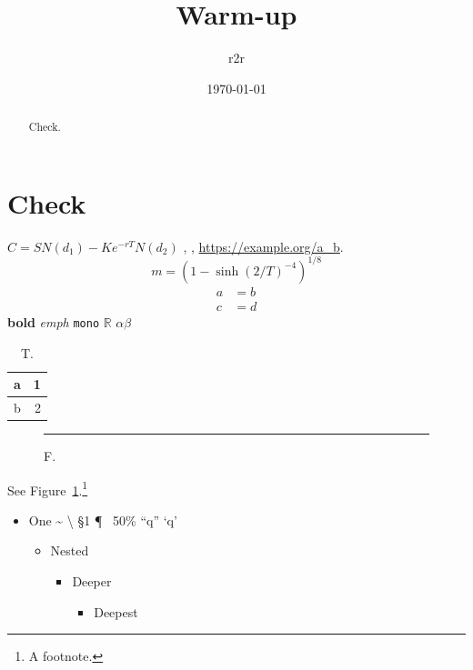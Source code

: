 \documentclass[11pt]{article}
\title{Warm-up}\author{r2r}\affil{none}\date{\today}
\begin{document}
\maketitle
\begin{abstract}Check.\end{abstract}
\begin{center}\end{center}
\section{Check}
$C = S N(d_1) - K e^{-rT} N(d_2)$ \cite{x}, \citet{x}, \url{https://example.org/a_b}.
\begin{equation} m = (1-\sinh(2/T)^{-4})^{1/8} \end{equation}
\begin{align} a &= b \\ c &= d \end{align}
\textbf{bold} \emph{emph} \texttt{mono} $\mathbb{R}$ $\alpha\beta$
\begin{table}[h]\centering\begin{tabular}{lr}\toprule a & 1\\\midrule b & 2\\\bottomrule\end{tabular}\caption{T.}\end{table}
\begin{figure}[h]\centering\rule{2cm}{1cm}\caption{F.}\label{fig:x}\end{figure}
See Figure~\ref{fig:x}.\footnote{A footnote.}
\begin{itemize}\item One \textbullet{} \textdegree{} \textmu{} \texttimes{} \textdiv{} \textpm{} \textperiodcentered{} \textellipsis{} \textendash{} \textemdash{} \textquotesingle{} \textasciitilde{} \textbackslash{} \S 1 \P\ \textregistered{} \textcopyright{} \texteuro{} \textcelsius{} 50\% ``q'' `q'
\begin{itemize}\item Nested\begin{itemize}\item Deeper\begin{itemize}\item Deepest\end{itemize}\end{itemize}\end{itemize}
\end{itemize}
\end{document}
